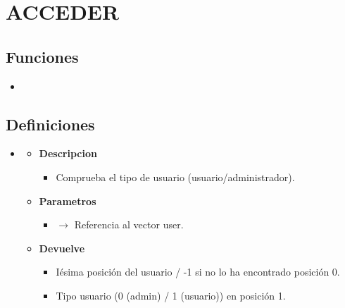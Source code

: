 \section{ACCEDER}

\subsection{Funciones}
\begin{itemize}
    \item {}
   
\end{itemize}
\subsection{Definiciones}
\begin{itemize}
    \item \label{acceder}
    \begin{itemize}
        \item \textbf{Descripcion}
        \begin{itemize}
			\item Comprueba el tipo de usuario (usuario/administrador).
		\end{itemize}
		\item \textbf{Parametros}
		\begin{itemize}
			\item {} $\rightarrow$ Referencia al vector user.
		\end{itemize}
		\item \textbf{Devuelve}
		\begin{itemize}
			\item Iésima posición del usuario / -1 si no lo ha encontrado posición 0.
			\item Tipo usuario (0 (admin) / 1 (usuario)) en posición 1.
		\end{itemize}
	\end{itemize}

\end{itemize}
